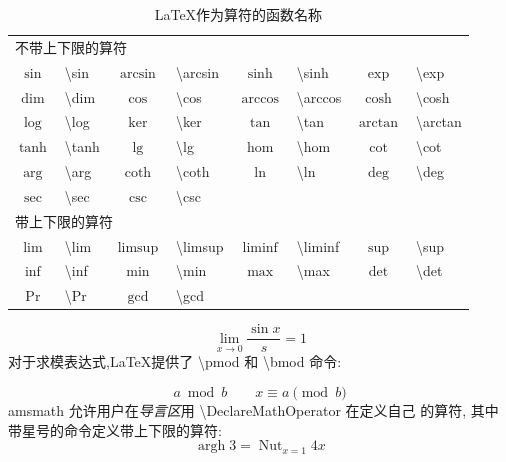 \documentclass[a4paper]{ctexart}
\DeclareMathOperator{\argh}{argh}
\DeclareMathOperator*{\nut}{Nut}
\begin{document}
    \begin{table}[H]
        \centering
        \caption{\LaTeX 作为算符的函数名称}
        \begin{tabular}{clclclcl}
            \toprule
            \multicolumn{8}{l}{不带上下限的算符}\\
            $\sin$          & \textbackslash sin        & $\arcsin$         & \textbackslash arcsin         &
            $\sinh$         & \textbackslash sinh       & $\exp$            & \textbackslash exp            \\
            $\dim$          & \textbackslash dim        & $\cos$            & \textbackslash cos            & 
            $\arccos$       & \textbackslash arccos     &$\cosh$            & \textbackslash cosh           \\
            $\log$          & \textbackslash log        & $\ker$            & \textbackslash ker            & 
            $\tan$          & \textbackslash tan        & $\arctan$         & \textbackslash arctan         \\
            $\tanh$         & \textbackslash tanh       & $\lg$             & \textbackslash lg             &
            $\hom$          & \textbackslash hom        & $\cot$            & \textbackslash cot            \\
            $\arg$          & \textbackslash arg        & $\coth$           & \textbackslash coth           &
            $\ln$           & \textbackslash ln         & $\deg$            & \textbackslash deg            \\
            $\sec$          & \textbackslash sec        & $\csc$            & \textbackslash csc            \\
            \midrule
            \multicolumn{8}{l}{带上下限的算符}\\
            $\lim$          & \textbackslash lim        & $\limsup$         & \textbackslash limsup         &
            $\liminf$       & \textbackslash liminf     & $\sup$            & \textbackslash sup            \\
            $\inf$          & \textbackslash inf        & $\min$            & \textbackslash min            &
            $\max$          & \textbackslash max        & $\det$            & \textbackslash det            \\
            $\Pr$           & \textbackslash Pr         & $\gcd$            & \textbackslash gcd            \\         
            \bottomrule
        \end{tabular}
    \end{table}
    \[
        \lim_{x \rightarrow 0} \frac{\sin x}{s} = 1    
    \]
    对于求模表达式,\LaTeX 提供了 \textbackslash pmod 和 \textbackslash bmod 命令:\par
    \[
        a \bmod b   \qquad
        x \equiv a \pmod{b}  
    \]
    amsmath 允许用户在\emph{导言区}用 \textbackslash DeclareMathOperator 在定义自己 的算符,%
    其中带星号的命令定义带上下限的算符:\\
    \[ \argh 3 = \nut_{x = 1} 4x \]
\end{document}
